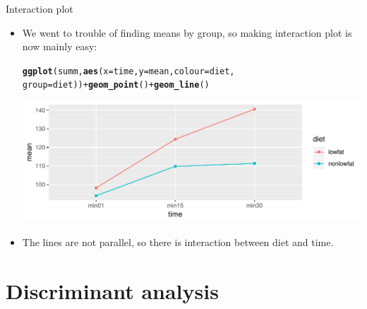 \documentclass[unknownkeysallowed]{beamer}\usepackage[]{graphicx}\usepackage[]{color}
\makeatletter
\def\maxwidth{ %
  \ifdim\Gin@nat@width>\linewidth
    \linewidth
  \else
    \Gin@nat@width
  \fi
}
\newcommand{\hlopt}[1]{\textcolor[rgb]{0,0,0}{#1}}%
\newcommand{\hlstd}[1]{\textcolor[rgb]{0.345,0.345,0.345}{#1}}%
\newcommand{\hlkwc}[1]{\textcolor[rgb]{0.333,0.667,0.333}{#1}}%
\newcommand{\hlkwd}[1]{\textcolor[rgb]{0.737,0.353,0.396}{\textbf{#1}}}%
\newenvironment{kframe}{%
 \def\at@end@of@kframe{}%
 \ifinner\ifhmode%
  \def\at@end@of@kframe{\end{minipage}}%
  \begin{minipage}{\columnwidth}%
 \fi\fi%
 \def\FrameCommand##1{\hskip\@totalleftmargin \hskip-\fboxsep
 \colorbox{shadecolor}{##1}\hskip-\fboxsep
     \hskip-\linewidth \hskip-\@totalleftmargin \hskip\columnwidth}%
 \MakeFramed {\advance\hsize-\width
   \@totalleftmargin\z@ \linewidth\hsize
   \@setminipage}}%
 {\par\unskip\endMakeFramed%
 \at@end@of@kframe}
\newenvironment{knitrout}{}{} %
\makeatother
\begin{document}
\begin{frame}[fragile]{Interaction plot}
\begin{itemize}
\item We went to trouble of finding means by group, so making
  interaction plot is now mainly easy:
  
\begin{knitrout}
\color{fgcolor}\begin{kframe}
\begin{alltt}
\hlkwd{ggplot}\hlstd{(summ,}\hlkwd{aes}\hlstd{(}\hlkwc{x}\hlstd{=time,}\hlkwc{y}\hlstd{=mean,}\hlkwc{colour}\hlstd{=diet,}
  \hlkwc{group}\hlstd{=diet))}\hlopt{+}\hlkwd{geom_point}\hlstd{()}\hlopt{+}\hlkwd{geom_line}\hlstd{()}
\end{alltt}
\end{kframe}
\includegraphics[width=\maxwidth]{figure/unnamed-chunk-262-1} 

\end{knitrout}

\item The lines are not parallel, so there is interaction between diet
  and time.
\end{itemize}



\end{frame}


\section{Discriminant analysis}
\frame{\sectionpage}
\end{document}
